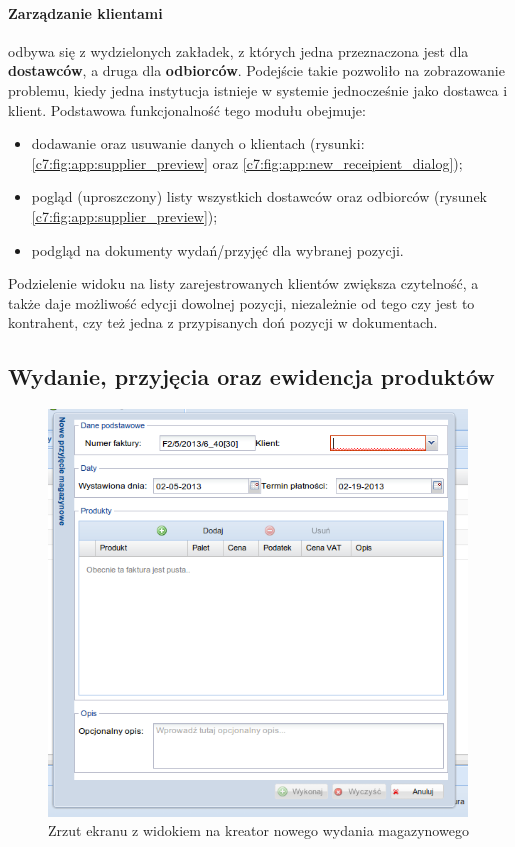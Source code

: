 		\paragraph{Zarządzanie klientami} odbywa się z wydzielonych zakładek, z których jedna przeznaczona jest
		dla \textbf{dostawców}, a druga dla \textbf{odbiorców}. Podejście takie pozwoliło na zobrazowanie problemu,
		kiedy jedna instytucja istnieje w systemie jednocześnie jako dostawca i klient. Podstawowa funkcjonalność tego
		modułu obejmuje:
		\begin{itemize}
			\item dodawanie oraz usuwanie danych o klientach (rysunki: \ref{c7:fig:app:supplier_preview} oraz \ref{c7:fig:app:new_receipient_dialog});
			\item pogląd (uproszczony) listy wszystkich dostawców oraz odbiorców (rysunek \ref{c7:fig:app:supplier_preview});
			\item podgląd na dokumenty wydań/przyjęć dla wybranej pozycji.
		\end{itemize}
		Podzielenie widoku na listy zarejestrowanych klientów zwiększa czytelność, a także daje możliwość edycji dowolnej pozycji,
		niezależnie od tego czy jest to kontrahent, czy też jedna z przypisanych doń pozycji w dokumentach.		
		
	\subsection{Wydanie, przyjęcia oraz ewidencja produktów}
		\begin{figure}[h]
			\centering
			\includegraphics[width=0.99\textwidth]{images/app/new_supply_preview}
			\caption[Aplikacja - Dodanie nowego dokumentu wydania]{Zrzut ekranu z widokiem na kreator nowego wydania magazynowego}
			\label{c7:fig:app:new_supply_preview}
		\end{figure}
		
